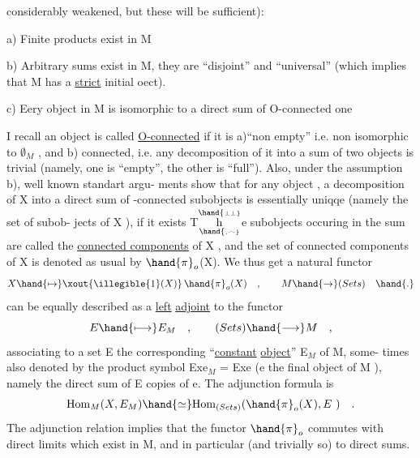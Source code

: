 considerably weakened,  but these will be sufficient):

a)  Finite products exist in M

b)  Arbitrary sums exist in M,  they are ``disjoint'' and ``universal''
(which implies that M has a \uline{strict} initial oect).

c)  Eery object in M is isomorphic to a direct sum of O-connected one

I recall an object is called \uline{O-connected} if it is  a)``non empty'' i.e.
non isomorphic to $\emptyset_M$ ,  and b) connected,  i.e. any decomposition of it
into a sum of two objects  is trivial (namely, one is ``empty'',  the other
is ``full''). Also,  under the assumption b),  well known standart argu-%
ments show that for any object , a decomposition of X into a direct sum
of -connected subobjects is essentially uniqqe (namely the  set of subob-%
jects of X ), if it exists  T$\overset{\hand{\scriptscriptstyle\perp\perp}}{\underset{\hand{\scriptscriptstyle,\frown}}{\mathrm h}}$e  subobjects 
occuring in the sum are called the \uline{connected components} of X ,  and the
set of connected components of X is denoted as usual by $\hand{\pi}_o$(X).  We thus
get a natural functor
\[ X \hand{\mapsto} \xout{\illegible{1}(X)}\,\hand{\pi}_o(X) \quad , \qquad M \hand{\to} (Sets) \quad \hand{.} \]
 can be equally described as a \uline{left} \uline{adjoint} to the functor
\[ E \hand{\longmapsto} E_M \quad , \qquad (Sets) \hand{\longrightarrow} M \quad , \]
associating to a set E the corresponding ``\uline{constant} \uline{object}'' E$_M$ of M,  some-%
times also denoted by the product symbol Exe$_M$ = Exe  (e the final object
of M ),  namely the direct sum  of E copies of e.  The adjunction formula
is
\[ \mathrm{Hom}_M(X,E_M) \hand{\simeq} \mathrm{Hom}_{(Sets)}(\hand{\pi}_o(X),E\ ) \quad . \]
The adjunction  relation implies that  the functor $\hand{\pi}_o$  commutes
with  direct limits  which exist in M,  and in particular (and trivially so)
to direct sums.

